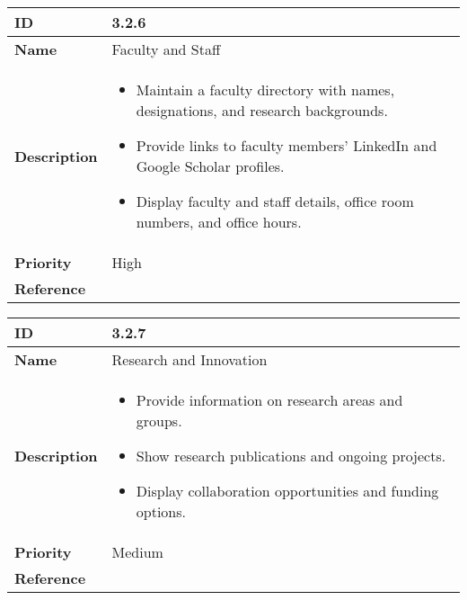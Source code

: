 \begin{center}
\begin{tabular}{ | >{\bfseries}m{5em} | m{10cm} |  } 
  \hline
  ID & 3.2.6\\  
  \hline
  Name & Faculty and Staff \\  
  \hline
  Description & 
  \begin{itemize}
      \item Maintain a faculty directory with names, designations, and research backgrounds.
      \item Provide links to faculty members' LinkedIn and Google Scholar profiles.
      \item Display faculty and staff details, office room numbers, and office hours.
  \end{itemize} \\ 
  \hline
  Priority & High\\
  \hline 
  Reference & \\
  \hline
\end{tabular}
\end{center}

\vspace{0.5cm}


\begin{center}
\begin{tabular}{ | >{\bfseries}m{5em} | m{10cm} |  } 
  \hline
  ID & 3.2.7\\  
  \hline
  Name & Research and Innovation \\  
  \hline
  Description & 
  \begin{itemize}
      \item Provide information on research areas and groups.
      \item Show research publications and ongoing projects.
      \item Display collaboration opportunities and funding options.
  \end{itemize} \\ 
  \hline
  Priority & Medium\\
  \hline 
  Reference & \\
  \hline
\end{tabular}
\end{center}

\vspace{0.5cm}


